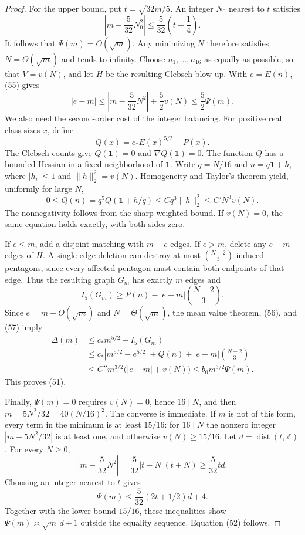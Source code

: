 \begin{proof}
For the upper bound, put $t=\sqrt{32m/5}$. An integer $N_0$ nearest to $t$
satisfies
\[
 \left|m-\frac5{32}N_0^2\right|
 \leq\frac5{32}\left(t+\frac14\right).
\]
It follows that $\Psi(m)=O(\sqrt m)$. Any minimizing $N$ therefore
satisfies $N=\Theta(\sqrt m)$ and tends to infinity. Choose
$n_1,\ldots,n_{16}$ as equally as possible, so that $V=v(N)$, and let $H$
be the resulting Clebsch blow-up. With $e=E(n)$, (55) gives
\begin{equation}\tag{56}\label{eq:56}
 |e-m|\leq\left|m-\frac5{32}N^2\right|+\frac52v(N)
 \leq\frac52\Psi(m).
\end{equation}
We also need the second-order cost of the integer balancing. For positive
real class sizes $x$, define
\[
 Q(x)=c_\ast E(x)^{5/2}-P(x).
\]
The Clebsch counts give $Q(\mathbf1)=0$ and $\nabla Q(\mathbf1)=0$. The
function $Q$ has a bounded Hessian in a fixed neighborhood of $\mathbf1$.
Write $q=N/16$ and $n=q\mathbf1+h$, where $|h_i|\leq1$ and
$\|h\|_2^2=v(N)$. Homogeneity and Taylor's theorem yield, uniformly for
large $N$,
\begin{equation}\tag{57}\label{eq:57}
 0\leq Q(n)=q^5Q(\mathbf1+h/q)
 \leq Cq^3\|h\|_2^2\leq C'N^3v(N).
\end{equation}
The nonnegativity follows from the sharp weighted bound. If $v(N)=0$, the
same equation holds exactly, with both sides zero.

If $e\leq m$, add a disjoint matching with $m-e$ edges. If $e>m$, delete
any $e-m$ edges of $H$. A single edge deletion can destroy at most
$\binom{N-2}3$ induced pentagons, since every affected pentagon must contain
both endpoints of that edge. Thus the resulting graph $G_m$ has exactly
$m$ edges and
\[
 I_5(G_m)\geq P(n)-|e-m|\binom{N-2}3.
\]
Since $e=m+O(\sqrt m)$ and $N=\Theta(\sqrt m)$, the mean value theorem,
(56), and (57) imply
\[
 \begin{split}
 \Delta(m)&\leq c_\ast m^{5/2}-I_5(G_m)\\
 &\leq c_\ast|m^{5/2}-e^{5/2}|+Q(n)+|e-m|\binom{N-2}3\\
 &\leq C''m^{3/2}\bigl(|e-m|+v(N)\bigr)
 \leq b_0m^{3/2}\Psi(m).
 \end{split}
\]
This proves (51).

Finally, $\Psi(m)=0$ requires $v(N)=0$, hence $16\mid N$, and then
$m=5N^2/32=40(N/16)^2$. The converse is immediate. If $m$ is not of this
form, every term in the minimum is at least $15/16$: for $16\mid N$ the
nonzero integer $|m-5N^2/32|$ is at least one, and otherwise
$v(N)\geq15/16$. Let $d=\operatorname{dist}(t,\mathbb Z)$. For every
$N\geq0$,
\[
 \left|m-\frac5{32}N^2\right|=\frac5{32}|t-N|(t+N)
 \geq\frac5{32}td.
\]
Choosing an integer nearest to $t$ gives
\[
 \Psi(m)\leq\frac5{32}(2t+1/2)d+4.
\]
Together with the lower bound $15/16$, these inequalities show
$\Psi(m)\asymp\sqrt m\,d+1$ outside the equality sequence. Equation (52)
follows.
\end{proof}

